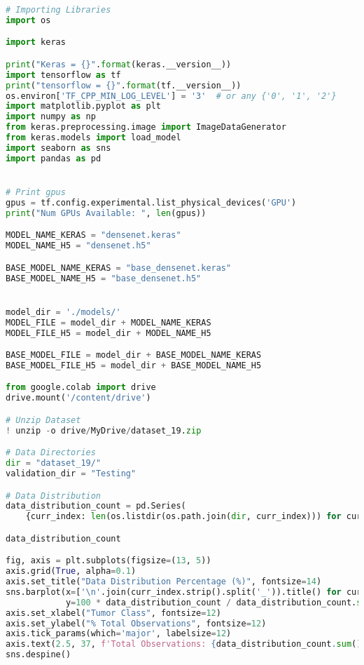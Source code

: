 \begin{lstlisting}[language=Python]
# Importing Libraries
import os

import keras

print("Keras = {}".format(keras.__version__))
import tensorflow as tf
print("tensorflow = {}".format(tf.__version__))
os.environ['TF_CPP_MIN_LOG_LEVEL'] = '3'  # or any {'0', '1', '2'}
import matplotlib.pyplot as plt
import numpy as np
from keras.preprocessing.image import ImageDataGenerator
from keras.models import load_model
import seaborn as sns
import pandas as pd


# Print gpus
gpus = tf.config.experimental.list_physical_devices('GPU')
print("Num GPUs Available: ", len(gpus))

MODEL_NAME_KERAS = "densenet.keras"
MODEL_NAME_H5 = "densenet.h5"

BASE_MODEL_NAME_KERAS = "base_densenet.keras"
BASE_MODEL_NAME_H5 = "base_densenet.h5"


model_dir = './models/'
MODEL_FILE = model_dir + MODEL_NAME_KERAS
MODEL_FILE_H5 = model_dir + MODEL_NAME_H5

BASE_MODEL_FILE = model_dir + BASE_MODEL_NAME_KERAS
BASE_MODEL_FILE_H5 = model_dir + BASE_MODEL_NAME_H5

from google.colab import drive
drive.mount('/content/drive')

# Unzip Dataset
! unzip -o drive/MyDrive/dataset_19.zip

# Data Directories
dir = "dataset_19/"
validation_dir = "Testing"

# Data Distribution
data_distribution_count = pd.Series(
    {curr_index: len(os.listdir(os.path.join(dir, curr_index))) for curr_index in os.listdir(dir)})

data_distribution_count

fig, axis = plt.subplots(figsize=(13, 5))
axis.grid(True, alpha=0.1)
axis.set_title("Data Distribution Percentage (%)", fontsize=14)
sns.barplot(x=['\n'.join(curr_index.strip().split('_')).title() for curr_index in data_distribution_count.index],
            y=100 * data_distribution_count / data_distribution_count.sum(), ax=axis)
axis.set_xlabel("Tumor Class", fontsize=12)
axis.set_ylabel("% Total Observations", fontsize=12)
axis.tick_params(which='major', labelsize=12)
axis.text(2.5, 37, f'Total Observations: {data_distribution_count.sum()}', fontdict=dict(size=12))
sns.despine()

\end{lstlisting}
